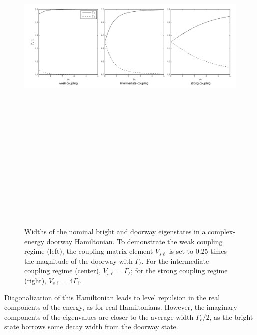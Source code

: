 \documentclass[12pt]{mitthesis}
\begin{document}
\begin{figure}
  \caption{Widths of the nominal bright and doorway eigenstates in a
    complex-energy doorway Hamiltonian. To demonstrate the weak
    coupling regime (left), the coupling matrix element $V_{s\ell}$ is
    set to 0.25 times the magnitude of the doorway with
    $\Gamma_{\ell}$. For the intermediate coupling regime (center),
    $V_{s\ell}=\Gamma_{\ell}$; for the strong coupling regime (right),
    $V_{s\ell}=4\Gamma_{\ell}$.}
  \label{fig:complex-widths}
  \centering
  \includegraphics[angle=90, height=7.4in]{complex-widths.png}
\end{figure}

Diagonalization of this Hamiltonian leads to level repulsion in the
real components of the energy, as for real Hamiltonians.  However, the
imaginary components of the eigenvalues are closer to the average
width $\Gamma_{\ell}/2$, as the bright state borrows some decay width
from the doorway state.
\end{document}

